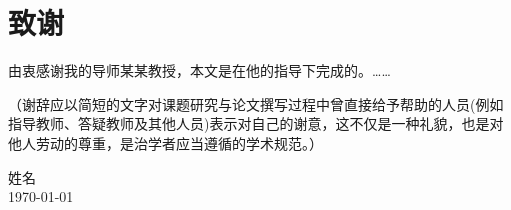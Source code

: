 \chapter{致谢}

由衷感谢我的导师某某教授，本文是在他的指导下完成的。……

（谢辞应以简短的文字对课题研究与论文撰写过程中曾直接给予帮助的人员(例如指导教师、答疑教师及其他人员)表示对自己的谢意，这不仅是一种礼貌，也是对他人劳动的尊重，是治学者应当遵循的学术规范。）

\vskip 108pt
\begin{flushright}
	姓名\makebox[1cm]{} \\
	\today
\end{flushright}


